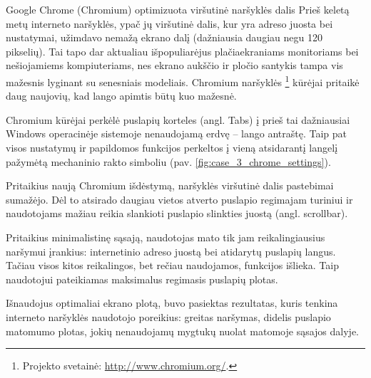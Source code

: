 \begin{xcase}{Google Chrome (Chromium) optimizuota viršutinė naršyklės dalis}
  \xcgoal
  {
    Prieš keletą metų interneto naršyklės, ypač jų viršutinė
    dalis, kur yra adreso juosta bei nustatymai, užimdavo nemažą
    ekrano dalį (dažniausia daugiau negu 120 pikselių). Tai tapo dar
    aktualiau išpopuliarėjus  plačiaekraniams monitoriams bei
    nešiojamiems kompiuteriams, nes ekrano aukščio ir pločio
    santykis tampa vis mažesnis lyginant su senesniais modeliais.
    Chromium naršyklės \footnote{Projekto svetainė:
    \url{http://www.chromium.org/}.} kūrėjai pritaikė  daug
    naujovių, kad lango apimtis būtų kuo mažesnė.
  }
  
  \xctools
  {
    Chromium kūrėjai perkėlė puslapių korteles (angl. Tabs) į
    prieš tai dažniausiai Windows operacinėje sistemoje nenaudojamą
    erdvę – lango antraštę. Taip pat visos nustatymų ir papildomos
    funkcijos perkeltos į vieną atsidarantį langelį pažymėtą
    mechaninio rakto simboliu (pav. \ref{fig:case_3_chrome_settings}).
	
    {
    }
  }
  
  \xcresult
  {
    Pritaikius naują Chromium išdėstymą, naršyklės viršutinė dalis
    pastebimai sumažėjo. Dėl to atsirado daugiau vietos atverto puslapio
    regimajam turiniui ir naudotojams mažiau reikia slankioti puslapio
    slinkties juostą (angl. scrollbar).
  }
  
  \xcprinciples
  {
    {
      Pritaikius minimalistinę sąsają, naudotojas mato tik jam
      reikalingiausius naršymui įrankius: internetinio adreso juostą
      bei atidarytų puslapių langus. Tačiau visos kitos reikalingos,
      bet rečiau naudojamos, funkcijos išlieka. Taip naudotojui
      pateikiamas maksimalus regimasis puslapių  plotas.
    }
  }
  
  \xcthoughts
  {
    Išnaudojus optimaliai ekrano plotą, buvo pasiektas rezultatas,
    kuris tenkina interneto naršyklės naudotojo poreikius: greitas
    naršymas, didelis puslapio matomumo plotas, jokių nenaudojamų
    mygtukų nuolat matomoje sąsajos dalyje.
  }
\end{xcase}
